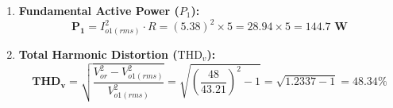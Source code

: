 \documentclass[11pt,a4paper]{article}
\begin{document}
\begin{examplebox}
\begin{enumerate}
  \item \textbf{Fundamental Active Power ($P_1$):}
  \begin{equation*}
  \mathbf{P_1} = I_{o1(rms)}^2 \cdot R = (5.38)^2 \times 5 = 28.94 \times 5 = \mathbf{144.7\text{ W}}
  \end{equation*}

  \item \textbf{Total Harmonic Distortion ($\text{THD}_v$):}
  \begin{equation*}
  \mathbf{\text{THD}_v} = \sqrt{\frac{V_{or}^2 - V_{o1(rms)}^2}{V_{o1(rms)}^2}} = \sqrt{\left(\frac{48}{43.21}\right)^2 - 1} = \sqrt{1.2337 - 1} = \mathbf{48.34\%}
  \end{equation*}
\end{enumerate}
\end{examplebox}
\end{document}
